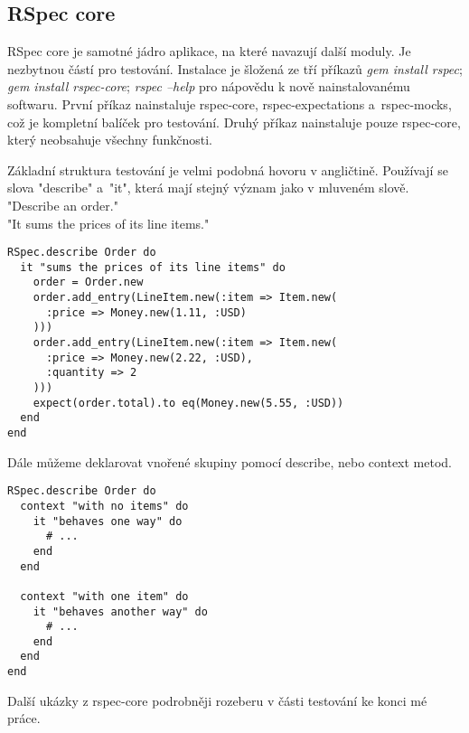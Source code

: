 \subsection{RSpec core}
\par RSpec core je samotné jádro aplikace, na které navazují další moduly. Je nezbytnou částí pro testování. Instalace je šložená ze tří příkazů \textit{gem install rspec}; \textit{gem install rspec-core}; \textit{rspec --help} pro nápovědu k nově nainstalovanému softwaru. První příkaz nainstaluje rspec-core, rspec-expectations a~rspec-mocks, což je kompletní balíček pro testování. Druhý příkaz nainstaluje pouze rspec-core, který neobsahuje všechny funkčnosti.
\par Základní struktura testování je velmi podobná hovoru v angličtině. Používají se slova "describe" a~"it", která mají stejný význam jako v mluveném slově.\\
"Describe an order."\\
"It sums the prices of its line items."\\
\begin{verbatim}
RSpec.describe Order do
  it "sums the prices of its line items" do
    order = Order.new
    order.add_entry(LineItem.new(:item => Item.new(
      :price => Money.new(1.11, :USD)
    )))
    order.add_entry(LineItem.new(:item => Item.new(
      :price => Money.new(2.22, :USD),
      :quantity => 2
    )))
    expect(order.total).to eq(Money.new(5.55, :USD))
  end
end
\end{verbatim}
\par Dále můžeme deklarovat vnořené skupiny pomocí describe, nebo context metod.
\begin{verbatim}
RSpec.describe Order do
  context "with no items" do
    it "behaves one way" do
      # ...
    end
  end

  context "with one item" do
    it "behaves another way" do
      # ...
    end
  end
end
\end{verbatim}
Další ukázky z rspec-core podrobněji rozeberu v části testování ke konci mé práce.

